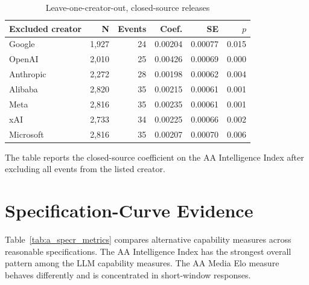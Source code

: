 \documentclass[12pt]{article}
\begin{document}
\begin{table}[htbp]
\centering
\caption{Leave-one-creator-out, closed-source releases}
\label{tab:a_loo}
\begin{threeparttable}
\begin{tabular}{lrrrrr}
\toprule
Excluded creator & N & Events & Coef. & SE & $p$ \\
\midrule
Google & 1,927 & 24 & 0.00204 & 0.00077 & 0.015 \\
OpenAI & 2,010 & 25 & 0.00426 & 0.00069 & 0.000 \\
Anthropic & 2,272 & 28 & 0.00198 & 0.00062 & 0.004 \\
Alibaba & 2,820 & 35 & 0.00215 & 0.00061 & 0.001 \\
Meta & 2,816 & 35 & 0.00235 & 0.00061 & 0.001 \\
xAI & 2,733 & 34 & 0.00225 & 0.00066 & 0.002 \\
Microsoft & 2,816 & 35 & 0.00207 & 0.00070 & 0.006 \\
\bottomrule
\end{tabular}
\begin{tablenotes}[flushleft]\footnotesize
\item The table reports the closed-source coefficient on the AA Intelligence
Index after excluding all events from the listed creator.
\end{tablenotes}
\end{threeparttable}
\end{table}

\section{Specification-Curve Evidence}
\label{app:specr}

Table~\ref{tab:a_specr_metrics} compares alternative capability measures across
reasonable specifications. The AA Intelligence Index has the strongest overall
pattern among the LLM capability measures. The AA Media Elo measure behaves
differently and is concentrated in short-window responses.
\end{document}
